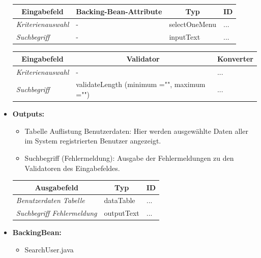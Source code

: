 \begin{itemize}
\begin{center}
\begin{longtable}{|p{3cm} |p{5cm} | p{4cm}|p{3cm}|}
						\hline \multicolumn{1}{|c|}{\textbf{Eingabefeld}} & \multicolumn{1}{|c|}{\textbf{Backing-Bean-Attribute}} & \multicolumn{1}{|c|}{\textbf{Typ}}  &  \multicolumn{1}{|c|}{\textbf{ID}} \\ \hline
						\endfirsthead
						\hline
						\endlastfoot
						\textit{Kriterienauswahl} & - & selectOneMenu & ... \\ \hline
						\textit{Suchbegriff} & - & inputText & ... \\ \hline
					\end{longtable}
				\end{center}
				
				\begin{center}
					\begin{longtable}{|p{3cm} |p{8cm} | p{5cm}|}
						
						\hline \multicolumn{1}{|c|}{\textbf{Eingabefeld}} & \multicolumn{1}{|c|}{\textbf{Validator}} & \multicolumn{1}{|c|}{\textbf{Konverter}} \\ \hline
						\endfirsthead
						\hline
						\endlastfoot
						\textit{Kriterienauswahl} & - & ... \\ \hline
						\textit{Suchbegriff} & validateLength (minimum ="", maximum ="") & ... \\ \hline
					\end{longtable}
				\end{center}
				
			\item \textbf{Outputs:}
				\begin{itemize}
					\item Tabelle Auflistung Benutzerdaten: Hier werden ausgewählte Daten aller im System registrierten Benutzer angezeigt.
					\item Suchbegriff (Fehlermeldung): Ausgabe der Fehlermeldungen zu den Validatoren des Eingabefeldes.
				\end{itemize}
				
					\begin{center}
						\begin{longtable}{|p{5cm} | p{4cm}|p{3cm}|}
							
							\hline \multicolumn{1}{|c|}{\textbf{Ausgabefeld}} & \multicolumn{1}{|c|}{\textbf{Typ}}  &  \multicolumn{1}{|c|}{\textbf{ID}} \\ \hline
							\endfirsthead
							\hline
							\endlastfoot
							\textit{Benutzerdaten Tabelle}  & dataTable & ... \\ \hline
							\textit{Suchbegriff Fehlermeldung}  & outputText & ... \\ \hline
						\end{longtable}
					\end{center}
				
			\item \textbf{BackingBean:}
				\begin{itemize}
					\item SearchUser.java
				\end{itemize}
		\end{itemize}
		
